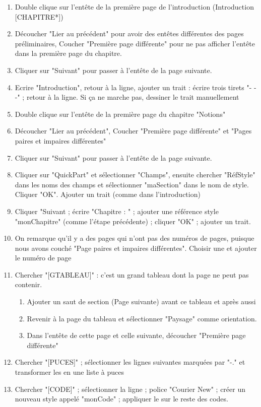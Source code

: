 \documentclass[11pt, a4paper]{article}
\begin{document}
\begin{enumerate}
	\item Double clique sur l'entête de la première page de l'introduction (Introduction [CHAPITRE*])
	\item Découcher "Lier au précédent" pour avoir des entêtes différentes des pages préliminaires, Coucher "Première page différente" pour ne pas afficher l'entête dans la première page du chapitre.
	\item Cliquer sur "Suivant" pour passer à l'entête de la page suivante.
	\item Ecrire "Introduction", retour à la ligne, ajouter un trait : écrire trois tirets "- - -" ; retour à la ligne. Si ça ne marche pas, dessiner le trait manuellement
	\item Double clique sur l'entête de la première page du chapitre "Notions"
	\item Découcher "Lier au précédent", Coucher "Première page différente" et "Pages paires et impaires différentes"
	\item Cliquer sur "Suivant" pour passer à l'entête de la page suivante.
	\item Cliquer sur "QuickPart" et sélectionner "Champs", ensuite chercher "RéfStyle" dans les noms des champs et sélectionner "maSection" dans le nom de style. Cliquer "OK".  Ajouter un trait (comme dans l'introduction)
	\item Cliquer "Suivant ; écrire "Chapitre : " ; ajouter une référence style "monChapitre" (comme l'étape précédente) ; cliquer "OK" ; ajouter un trait.
	\item On remarque qu'il y a des pages qui n'ont pas des numéros de pages, puisque nous avons couché "Page paires et impaires différentes". Choisir une et ajouter le numéro de page
	
	\item Chercher "[GTABLEAU]" : c'est un grand tableau dont la page ne peut pas contenir. 
	\begin{enumerate}
		\item Ajouter un saut de section (Page suivante) avant ce tableau et après aussi
		\item Revenir à la page du tableau et sélectionner "Paysage" comme orientation.
		\item Dans l'entête de cette page et celle suivante, découcher "Première page différente"
	\end{enumerate}
	
	\item Chercher "[PUCES]" ; sélectionner les lignes suivantes marquées par "-." et transformer les en une liste à puces
	\item Chercher "[CODE]" ; sélectionner la ligne ; police "Courier New" ; créer un nouveau style appelé "monCode" ; appliquer le sur le reste des codes.
	
\end{enumerate}
\end{document}
